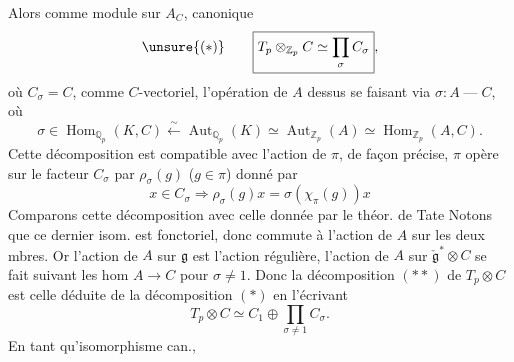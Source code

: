 Alors comme module sur $A_C$,   canonique
\[
\unsure{(*)}\qquad\boxed{T_p\otimes_{\mathbb Z_p}C\simeq\prod_\sigma C_\sigma},
\]
où $C_\sigma=C$, comme $C$-vectoriel, l'opération de $A$ dessus se faisant via $\sigma:A\mathrel{\text{---}}C$, où
\[
\sigma\in\operatorname{Hom}_{\mathbb Q_p}(K,C)\xleftarrow{\sim}\operatorname{Aut}_{\mathbb Q_p}(K)\simeq\operatorname{Aut}_{\mathbb Z_p}(A)\simeq\operatorname{Hom}_{\mathbb Z_p}(A,C).
\]
\margin{$*$}
Cette décomposition est compatible avec l'action de $\pi$, de façon précise, $\pi$ opère sur le facteur $C_\sigma$ par $\rho_\sigma(g)$ ($g\in\pi$) donné par
\[
x\in C_\sigma\Longrightarrow\rho_\sigma(g)x=\sigma(\chi_\pi(g))x
\]
Comparons cette décomposition avec celle donnée par le théor. de Tate
Notons que ce dernier isom. est fonctoriel, donc commute à l'action de $A$ sur les deux mbres. Or  l'action de $A$ sur $\mathfrak g$ est l'action régulière, l'action de $A$ sur $\check{\mathfrak g}^{*}\otimes C$ se fait suivant les hom $A\longrightarrow C$ pour $\sigma\ne1$. Donc la décomposition $(**)$ de $T_p\otimes C$ est celle déduite de la décomposition $(*)$ en  l'écrivant
\[
T_p\otimes C\simeq C_1\oplus\prod_{\sigma\ne1}C_\sigma.
\]
 En tant qu'isomorphisme can., 
